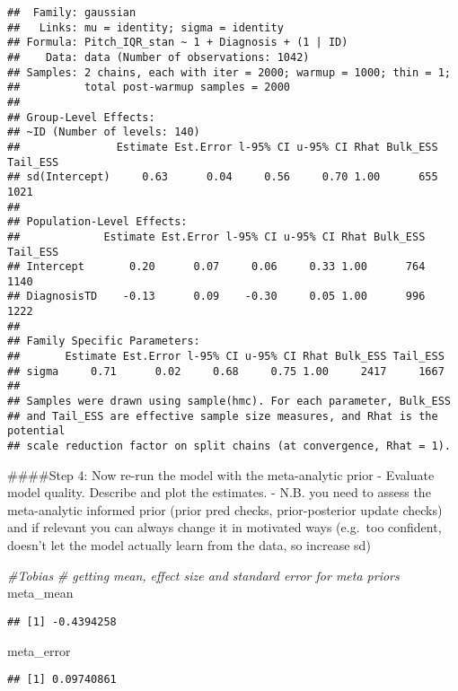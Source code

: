 \documentclass[
]{article}
\newenvironment{Shaded}{\begin{snugshade}}{\end{snugshade}}
\newcommand{\CommentTok}[1]{\textcolor[rgb]{0.56,0.35,0.01}{\textit{#1}}}
\newcommand{\NormalTok}[1]{#1}
\begin{document}
\begin{verbatim}
##  Family: gaussian 
##   Links: mu = identity; sigma = identity 
## Formula: Pitch_IQR_stan ~ 1 + Diagnosis + (1 | ID) 
##    Data: data (Number of observations: 1042) 
## Samples: 2 chains, each with iter = 2000; warmup = 1000; thin = 1;
##          total post-warmup samples = 2000
## 
## Group-Level Effects: 
## ~ID (Number of levels: 140) 
##               Estimate Est.Error l-95% CI u-95% CI Rhat Bulk_ESS Tail_ESS
## sd(Intercept)     0.63      0.04     0.56     0.70 1.00      655     1021
## 
## Population-Level Effects: 
##             Estimate Est.Error l-95% CI u-95% CI Rhat Bulk_ESS Tail_ESS
## Intercept       0.20      0.07     0.06     0.33 1.00      764     1140
## DiagnosisTD    -0.13      0.09    -0.30     0.05 1.00      996     1222
## 
## Family Specific Parameters: 
##       Estimate Est.Error l-95% CI u-95% CI Rhat Bulk_ESS Tail_ESS
## sigma     0.71      0.02     0.68     0.75 1.00     2417     1667
## 
## Samples were drawn using sample(hmc). For each parameter, Bulk_ESS
## and Tail_ESS are effective sample size measures, and Rhat is the potential
## scale reduction factor on split chains (at convergence, Rhat = 1).
\end{verbatim}

\#\#\#\#Step 4: Now re-run the model with the meta-analytic prior -
Evaluate model quality. Describe and plot the estimates. - N.B. you need
to assess the meta-analytic informed prior (prior pred checks,
prior-posterior update checks) and if relevant you can always change it
in motivated ways (e.g.~too confident, doesn't let the model actually
learn from the data, so increase sd)

\begin{Shaded}
\begin{Highlighting}[]
\CommentTok{\#Tobias}
\CommentTok{\# getting mean, effect size and standard error for meta priors}
\NormalTok{meta\_mean}
\end{Highlighting}
\end{Shaded}

\begin{verbatim}
## [1] -0.4394258
\end{verbatim}

\begin{Shaded}
\begin{Highlighting}[]
\NormalTok{meta\_error}
\end{Highlighting}
\end{Shaded}

\begin{verbatim}
## [1] 0.09740861
\end{verbatim}
\end{document}
